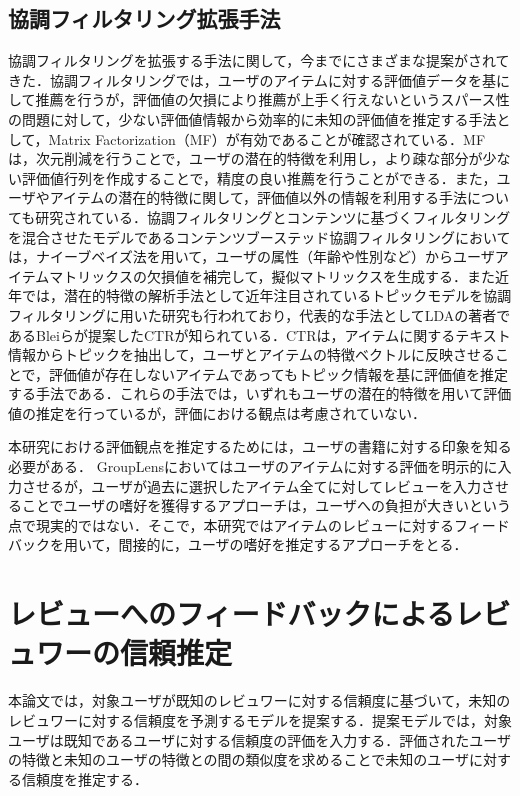 \documentclass[a4paper,11pt,oneside,openany]{jsbook}
\begin{document}
	\section{協調フィルタリング拡張手法}
協調フィルタリングを拡張する手法に関して，今までにさまざまな提案がされてきた．協調フィルタリングでは，ユーザのアイテムに対する評価値データを基にして推薦を行うが，評価値の欠損により推薦が上手く行えないというスパース性の問題に対して，少ない評価値情報から効率的に未知の評価値を推定する手法として，Matrix Factorization（MF）\cite{MF}が有効であることが確認されている．MFは，次元削減を行うことで，ユーザの潜在的特徴を利用し，より疎な部分が少ない評価値行列を作成することで，精度の良い推薦を行うことができる．また，ユーザやアイテムの潜在的特徴に関して，評価値以外の情報を利用する手法についても研究されている．協調フィルタリングとコンテンツに基づくフィルタリングを混合させたモデルであるコンテンツブーステッド協調フィルタリング\cite{Melville}においては，ナイーブベイズ法を用いて，ユーザの属性（年齢や性別など）からユーザアイテムマトリックスの欠損値を補完して，擬似マトリックスを生成する．また近年では，潜在的特徴の解析手法として近年注目されているトピックモデルを協調フィルタリングに用いた研究も行われており，代表的な手法としてLDAの著者であるBleiらが提案したCTRが知られている\cite{CTR}．CTRは，アイテムに関するテキスト情報からトピックを抽出して，ユーザとアイテムの特徴ベクトルに反映させることで，評価値が存在しないアイテムであってもトピック情報を基に評価値を推定する手法である．これらの手法では，いずれもユーザの潜在的特徴を用いて評価値の推定を行っているが，評価における観点は考慮されていない．
\par
本研究における評価観点を推定するためには，ユーザの書籍に対する印象を知る必要がある．
GroupLens\cite{grouplens}においてはユーザのアイテムに対する評価を明示的に入力させるが，ユーザが過去に選択したアイテム全てに対してレビューを入力させることでユーザの嗜好を獲得するアプローチは，ユーザへの負担が大きいという点で現実的ではない．そこで，本研究ではアイテムのレビューに対するフィードバックを用いて，間接的に，ユーザの嗜好を推定するアプローチをとる．


\chapter{レビューへのフィードバックによるレビュワーの信頼推定}
本論文では，対象ユーザが既知のレビュワーに対する信頼度に基づいて，未知のレビュワーに対する信頼度を予測するモデルを提案する．提案モデルでは，対象ユーザは既知であるユーザに対する信頼度の評価を入力する．評価されたユーザの特徴と未知のユーザの特徴との間の類似度を求めることで未知のユーザに対する信頼度を推定する．
\end{document}
